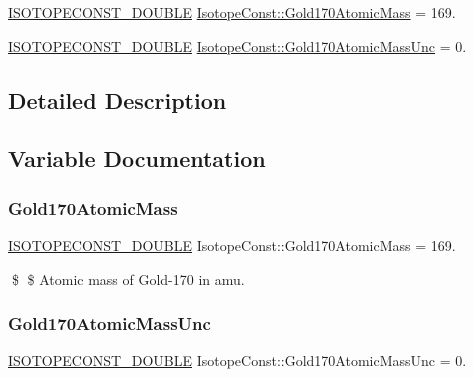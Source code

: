\begin{DoxyCompactItemize}
\item 
\mbox{\hyperlink{group___isotope_const-_macros_ga8f45a7272ce02c0b4c65c44636ed719a}{I\+S\+O\+T\+O\+P\+E\+C\+O\+N\+S\+T\+\_\+\+D\+O\+U\+B\+LE}} \mbox{\hyperlink{group___isotope_const-_gold-_au170_gab39b7ba86d7f5ded78822c62c679a404}{Isotope\+Const\+::\+Gold170\+Atomic\+Mass}} = 169.
\item 
\mbox{\hyperlink{group___isotope_const-_macros_ga8f45a7272ce02c0b4c65c44636ed719a}{I\+S\+O\+T\+O\+P\+E\+C\+O\+N\+S\+T\+\_\+\+D\+O\+U\+B\+LE}} \mbox{\hyperlink{group___isotope_const-_gold-_au170_ga6fa67fcefe2eea33a9be76f530a74682}{Isotope\+Const\+::\+Gold170\+Atomic\+Mass\+Unc}} = 0.
\end{DoxyCompactItemize}


\subsection{Detailed Description}


\subsection{Variable Documentation}
\mbox{\label{group___isotope_const-_gold-_au170_gab39b7ba86d7f5ded78822c62c679a404}} 
\subsubsection{\texorpdfstring{Gold170\+Atomic\+Mass}{Gold170AtomicMass}}
{\footnotesize\ttfamily \mbox{\hyperlink{group___isotope_const-_macros_ga8f45a7272ce02c0b4c65c44636ed719a}{I\+S\+O\+T\+O\+P\+E\+C\+O\+N\+S\+T\+\_\+\+D\+O\+U\+B\+LE}} Isotope\+Const\+::\+Gold170\+Atomic\+Mass = 169.}

\$ \$ Atomic mass of Gold-\/170 in amu. \mbox{\label{group___isotope_const-_gold-_au170_ga6fa67fcefe2eea33a9be76f530a74682}} 
\subsubsection{\texorpdfstring{Gold170\+Atomic\+Mass\+Unc}{Gold170AtomicMassUnc}}
{\footnotesize\ttfamily \mbox{\hyperlink{group___isotope_const-_macros_ga8f45a7272ce02c0b4c65c44636ed719a}{I\+S\+O\+T\+O\+P\+E\+C\+O\+N\+S\+T\+\_\+\+D\+O\+U\+B\+LE}} Isotope\+Const\+::\+Gold170\+Atomic\+Mass\+Unc = 0.}


